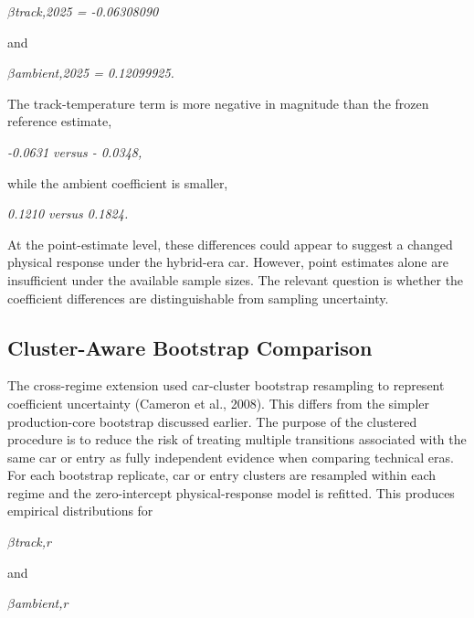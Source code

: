 \begin{center}\textit{\ensuremath{\beta}track,2025 = -0.06308090}\end{center}

and

\begin{center}\textit{\ensuremath{\beta}ambient,2025 = 0.12099925.}\end{center}

The track-temperature term is more negative in magnitude than the frozen reference estimate,

\begin{center}\textit{-0.0631       versus       - 0.0348,}\end{center}

while the ambient coefficient is smaller,

\begin{center}\textit{0.1210    versus      0.1824.}\end{center}

At the point-estimate level, these differences could appear to suggest a changed physical response under the hybrid-era car. However, point estimates alone are insufficient under the available sample sizes. The relevant question is whether the coefficient differences are distinguishable from sampling uncertainty.

\subsection{Cluster-Aware Bootstrap Comparison}
The cross-regime extension used car-cluster bootstrap resampling to represent coefficient uncertainty (Cameron et al., 2008). This differs from the simpler production-core bootstrap discussed earlier. The purpose of the clustered procedure is to reduce the risk of treating multiple transitions associated with the same car or entry as fully independent evidence when comparing technical eras. For each bootstrap replicate, car or entry clusters are resampled within each regime and the zero-intercept physical-response model is refitted. This produces empirical distributions for

\begin{center}\textit{\ensuremath{\beta}track,r}\end{center}

and

\begin{center}\textit{\ensuremath{\beta}ambient,r}\end{center}


